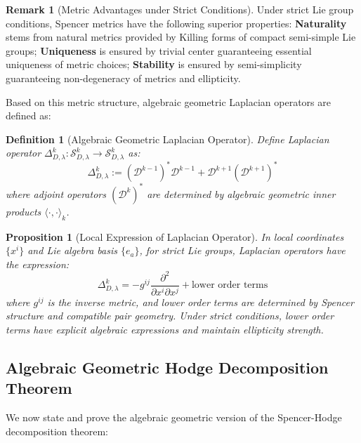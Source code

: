 \documentclass[a4paper,12pt]{extarticle}
\newtheorem{proposition}[theorem]{Proposition}
\newtheorem{definition}{Definition}
\theoremstyle{definition}
\newtheorem{remark}{Remark}
\begin{document}
\begin{remark}[Metric Advantages under Strict Conditions]
Under strict Lie group conditions, Spencer metrics have the following superior properties: \textbf{Naturality} stems from natural metrics provided by Killing forms of compact semi-simple Lie groups; \textbf{Uniqueness} is ensured by trivial center guaranteeing essential uniqueness of metric choices; \textbf{Stability} is ensured by semi-simplicity guaranteeing non-degeneracy of metrics and ellipticity.
\end{remark}

Based on this metric structure, algebraic geometric Laplacian operators are defined as:

\begin{definition}[Algebraic Geometric Laplacian Operator]
Define Laplacian operator $\Delta^k_{D,\lambda}: \mathcal{S}^k_{D,\lambda} \to \mathcal{S}^k_{D,\lambda}$ as:
\begin{equation}\label{eq:alg-laplacian}
\Delta^k_{D,\lambda} := (\mathcal{D}^{k-1})^* \mathcal{D}^{k-1} + \mathcal{D}^{k+1}(\mathcal{D}^{k+1})^*
\end{equation}
where adjoint operators $(\mathcal{D}^k)^*$ are determined by algebraic geometric inner products $\langle \cdot, \cdot \rangle_k$.
\end{definition}

\begin{proposition}[Local Expression of Laplacian Operator]
In local coordinates $\{x^i\}$ and Lie algebra basis $\{e_a\}$, for strict Lie groups, Laplacian operators have the expression:
\begin{equation}\label{eq:laplacian-local}
\Delta^k_{D,\lambda} = -g^{ij} \frac{\partial^2}{\partial x^i \partial x^j} + \text{lower order terms}
\end{equation}
where $g^{ij}$ is the inverse metric, and lower order terms are determined by Spencer structure and compatible pair geometry. Under strict conditions, lower order terms have explicit algebraic expressions and maintain ellipticity strength.
\end{proposition}

\subsection{Algebraic Geometric Hodge Decomposition Theorem}

We now state and prove the algebraic geometric version of the Spencer-Hodge decomposition theorem:
\end{document}
